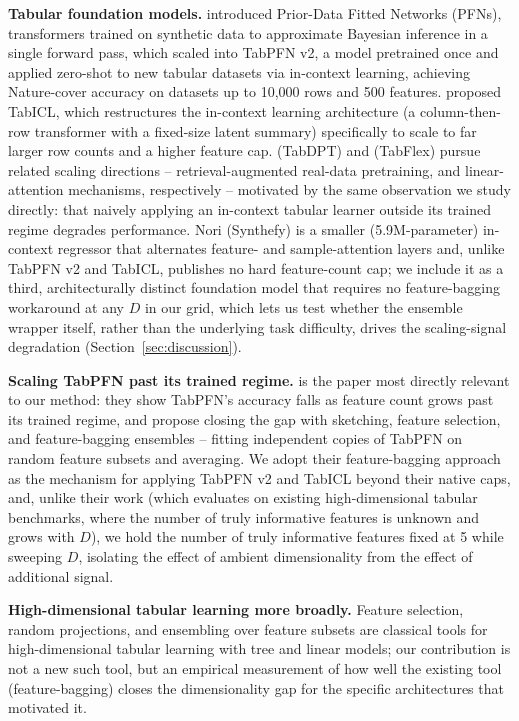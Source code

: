 \documentclass{article}
\begin{document}
\textbf{Tabular foundation models.} \citet{muller2022transformers} introduced Prior-Data
Fitted Networks (PFNs), transformers trained on synthetic data to approximate Bayesian
inference in a single forward pass, which \citet{hollmann2025tabpfn} scaled into TabPFN
v2, a model pretrained once and applied zero-shot to new tabular datasets via
in-context learning, achieving Nature-cover accuracy on datasets up to 10,000 rows and
500 features. \citet{qu2025tabicl} proposed TabICL, which restructures the in-context
learning architecture (a column-then-row transformer with a fixed-size latent
summary) specifically to scale to far larger row counts and a higher feature cap.
\citet{ma2024tabdpt} (TabDPT) and \citet{zeng2025tabflex} (TabFlex) pursue related
scaling directions -- retrieval-augmented real-data pretraining, and linear-attention
mechanisms, respectively -- motivated by the same observation we study directly: that
naively applying an in-context tabular learner outside its trained regime degrades
performance. Nori (Synthefy) is a smaller (5.9M-parameter) in-context regressor that
alternates feature- and sample-attention layers and, unlike TabPFN v2 and TabICL,
publishes no hard feature-count cap; we include it as a third, architecturally
distinct foundation model that requires no feature-bagging workaround at any $D$ in
our grid, which lets us test whether the ensemble wrapper itself, rather than the
underlying task difficulty, drives the scaling-signal degradation
(Section~\ref{sec:discussion}).

\textbf{Scaling TabPFN past its trained regime.} \citet{feuer2023scaling} is the paper
most directly relevant to our method: they show TabPFN's accuracy falls as feature
count grows past its trained regime, and propose closing the gap with sketching,
feature selection, and feature-bagging ensembles -- fitting independent copies of
TabPFN on random feature subsets and averaging. We adopt their feature-bagging
approach as the mechanism for applying TabPFN v2 and TabICL beyond their native caps,
and, unlike their work (which evaluates on existing high-dimensional tabular
benchmarks, where the number of truly informative features is unknown and grows with
$D$), we hold the number of truly informative features fixed at 5 while sweeping $D$,
isolating the effect of ambient dimensionality from the effect of additional signal.

\textbf{High-dimensional tabular learning more broadly.} Feature selection, random
projections, and ensembling over feature subsets are classical tools for
high-dimensional tabular learning with tree and linear models; our contribution is not
a new such tool, but an empirical measurement of how well the existing tool
(feature-bagging) closes the dimensionality gap for the specific architectures that
motivated it.
\end{document}
